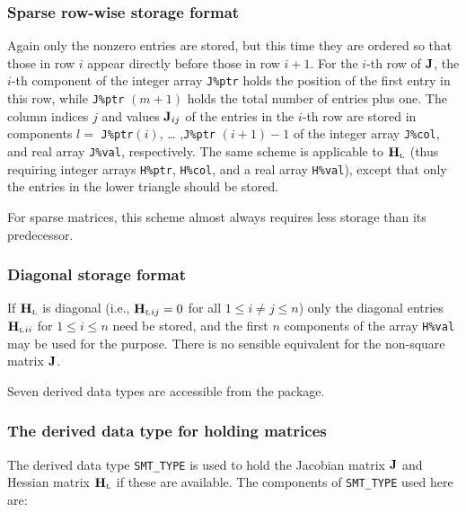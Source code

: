 \documentclass{galahad}
\newcommand{\bmHL}{\bmH\sub{L}}
\begin{document}
\subsubsection{Sparse row-wise storage format}\label{rowwise}
Again only the nonzero entries are stored, but this time they are
ordered so that those in row $i$ appear directly before those in row
$i+1$. For the $i$-th row of ${\mathbf{J}}$, the $i$-th component of the integer
array {\tt J\%ptr} holds the position of the first entry in this row,
while {\tt J\%ptr} $(m+1)$ holds the total number of entries plus one.
The column indices $j$ and values ${\mathbf{J}}_{ij}$ of the entries in the
$i$-th row are stored in components $l =$ {\tt J\%ptr}$(i)$, \ldots
,{\tt J\%ptr} $(i+1)-1$ of the integer array {\tt J\%col}, and real
array {\tt J\%val}, respectively.
The same scheme is applicable to
$\bmHL$ (thus requiring integer arrays {\tt H\%ptr}, {\tt H\%col}, and
a real array {\tt H\%val}),
except that only the entries in the lower triangle should be stored.

For sparse matrices, this scheme almost always requires less storage than
its predecessor.

\subsubsection{Diagonal storage format}\label{diagonal}
If $\bmHL$ is diagonal (i.e., $\bmHL{}_{ij} = 0$ for all 
$1 \leq i \neq j \leq n$)
only the diagonal entries $\bmHL{}_{ii}$ for $1 \leq i \leq n$ need be stored,
and the first $n$ components of the array {\tt H\%val} may be used for
the purpose. There is no sensible equivalent for the non-square matrix ${\mathbf{J}}$.





\galtypes
Seven derived data types are accessible from the package.


\subsubsection{The derived data type for holding matrices}\label{typesmt}
The derived data type {\tt SMT\_TYPE} is used to hold the Jacobian matrix 
${\mathbf{J}}$ and Hessian matrix $\bmHL$
if these are available. The components of {\tt SMT\_TYPE} used here are:
\end{document}

